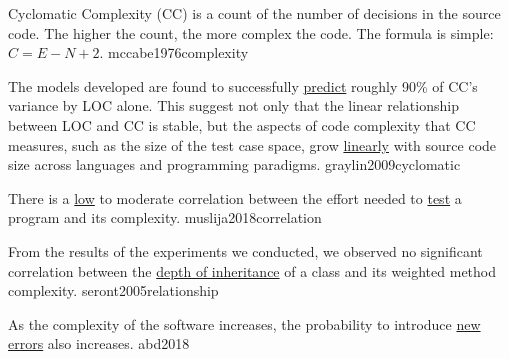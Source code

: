 \documentclass{article}
\begin{document}


  {Cyclomatic Complexity (CC) is a count of the number of decisions in the source code. The higher the count, the more complex the code. The formula is simple: \(C=E-N+2\).}
  {mccabe1976complexity}



  {The models developed are found to successfully \ul{predict} roughly 90\% of CC’s variance by LOC alone. This suggest not only that the linear relationship between LOC and CC is stable, but the aspects of code complexity that CC measures, such as the size of the test case space, grow \ul{linearly} with source code size across languages and programming paradigms.}
  {graylin2009cyclomatic}

  {There is a \ul{low} to moderate correlation between the effort needed to \ul{test} a program and its complexity.}
  {muslija2018correlation}

  {From the results of the experiments we conducted, we observed no significant correlation between the \ul{depth of inheritance} of a class and its weighted method complexity.}
  {seront2005relationship}

  {As the complexity of the software increases, the probability to introduce \ul{new errors} also increases.}
  {abd2018}



\end{document}

